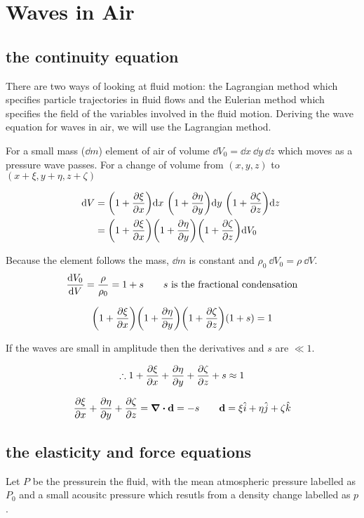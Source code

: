 \documentclass[10pt, a4paper, twocolumn]{article}
\begin{document}
\section{Waves in Air}
\subsection{the continuity equation}

There are two ways of looking at fluid motion: the Lagrangian method which specifies particle trajectories in fluid flows and the Eulerian method which specifies the field of the variables involved in the fluid motion. Deriving the wave equation for waves in air, we will use the Lagrangian method.

For a small mass ($\dd m$) element of air of volume $\dd V_0 = \dd x\ \dd y\ \dd z $ which moves as a pressure wave passes. For a change of volume from $(x,y,z)$ to $(x+\xi, y+\eta, z + \zeta)$

\begin{equation*}
\begin{aligned}
\dd V &= \qty(1+\pdv{\xi}{x})\dd x\
\qty(1+\pdv{\eta}{y})\dd y\
\qty(1+\pdv{\zeta}{z})\dd z\
\\&= \qty(1+\pdv{\xi}{x})
\qty(1+\pdv{\eta}{y})
\qty(1+\pdv{\zeta}{z}) \dd V_0
\end{aligned}
\end{equation*}

Because the element follows the mass, $\dd m$ is constant and $\rho _0 \ \dd V_0 = \rho \ \dd V$.
\[\dv{V_0}{V} = \frac{\rho}{\rho _0} = 1+s
\qquad s\text{ is the fractional condensation} \]

\[ \qty(1+\pdv{\xi}{x}) \qty(1+\pdv{\eta}{y})
\qty(1+\pdv{\zeta}{z}) (1+s) =1 \]

If the waves are small in amplitude then the derivatives and $s$ are $\ll 1$.

\[\therefore 1+\pdv{\xi}{x}+\pdv{\eta}{y}+\pdv{\zeta}{z}
+ s \approx 1 \]

\[\pdv{\xi}{x}+\pdv{\eta}{y}+\pdv{\zeta}{z}
= \div{\vb d} = -s
\qquad \vb d = \xi\hat i+\eta\hat j+\zeta\hat k \]

\subsection{the elasticity and force equations}

Let $P$ be the pressurein the fluid, with the mean atmospheric pressure labelled as $P_0$ and a small acousitc pressure which resutls from a density change labelled as $p$.
\end{document}
